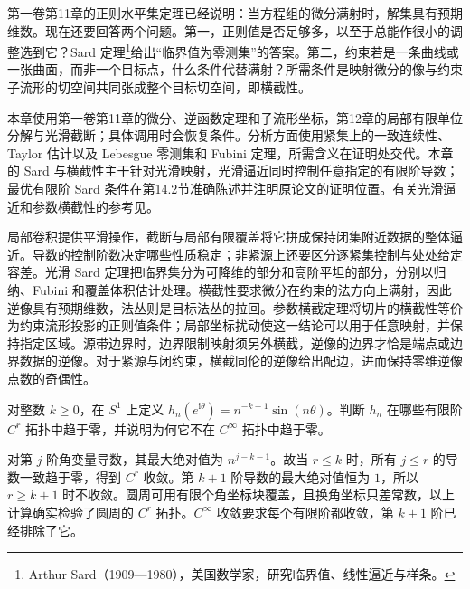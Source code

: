 \ProseParagraphBreak

第一卷第11章的正则水平集定理已经说明：当方程组的微分满射时，解集具有预期维数。现在还要回答两个问题。第一，正则值是否足够多，以至于总能作很小的调整选到它？Sard 定理\footnote{Arthur Sard（1909—1980），美国数学家，研究临界值、线性逼近与样条。}给出“临界值为零测集”的答案。第二，约束若是一条曲线或一张曲面，而非一个目标点，什么条件代替满射？所需条件是映射微分的像与约束子流形的切空间共同张成整个目标切空间，即横截性。

\ProseParagraphBreak

本章使用第一卷第11章的微分、逆函数定理和子流形坐标，第12章的局部有限单位分解与光滑截断；具体调用时会恢复条件。分析方面使用紧集上的一致连续性、Taylor 估计以及 Lebesgue 零测集和 Fubini 定理，所需含义在证明处交代。本章的 Sard 与横截性主干针对光滑映射，光滑逼近同时控制任意指定的有限阶导数；最优有限阶 Sard 条件在第14.2节准确陈述并注明原论文的证明位置。有关光滑逼近和参数横截性的参考见\cite[第6章]{Lee2012Smooth}。






\begin{chaptersummary}
	局部卷积提供平滑操作，截断与局部有限覆盖将它拼成保持闭集附近数据的整体逼近。导数的控制阶数决定哪些性质稳定；非紧源上还要区分逐紧集控制与处处给定容差。光滑 Sard 定理把临界集分为可降维的部分和高阶平坦的部分，分别以归纳、Fubini 和覆盖体积估计处理。横截性要求微分在约束的法方向上满射，因此逆像具有预期维数，法丛则是目标法丛的拉回。参数横截定理将切片的横截性等价为约束流形投影的正则值条件；局部坐标扰动使这一结论可以用于任意映射，并保持指定区域。源带边界时，边界限制映射须另外横截，逆像的边界才恰是端点或边界数据的逆像。对于紧源与闭约束，横截同伦的逆像给出配边，进而保持零维逆像点数的奇偶性。
\end{chaptersummary}

\BookExercises

\begin{exercise}\label{g2:ex:cr-convergence-orders}
	对整数 \(k\ge0\)，在 \(S^1\) 上定义 \(h_n(e^{\mathrm{i}\theta})=n^{-k-1}\sin(n\theta)\)。判断 \(h_n\) 在哪些有限阶 \(C^r\) 拓扑中趋于零，并说明为何它不在 \(C^\infty\) 拓扑中趋于零。
\end{exercise}
\begin{solution}
	对第 \(j\) 阶角变量导数，其最大绝对值为 \(n^{j-k-1}\)。故当 \(r\le k\) 时，所有 \(j\le r\) 的导数一致趋于零，得到 \(C^r\) 收敛。第 \(k+1\) 阶导数的最大绝对值恒为 \(1\)，所以 \(r\ge k+1\) 时不收敛。圆周可用有限个角坐标块覆盖，且换角坐标只差常数，以上计算确实检验了圆周的 \(C^r\) 拓扑。\(C^\infty\) 收敛要求每个有限阶都收敛，第 \(k+1\) 阶已经排除了它。
\end{solution}

